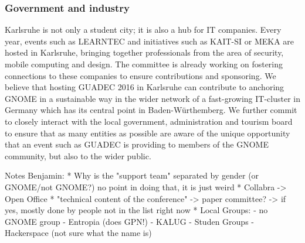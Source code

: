 \subsubsection{ Government and industry}

Karlsruhe is not only a student city; it is also a hub for IT companies. Every year, events such as LEARNTEC and initiatives such as KAIT-SI or MEKA are hosted in Karlsruhe, bringing together professionals from the area of security, mobile computing and design. The committee is already working on fostering connections to these companies to ensure contributions and sponsoring. We believe that hosting GUADEC 2016 in Karlsruhe can contribute to anchoring GNOME in a sustainable way in the wider network of a fast-growing IT-cluster in Germany which has its central point in Baden-Würthemberg. We further commit to closely interact with the local government, administration and tourism board to ensure that as many entities as possible are aware of the unique opportunity that an event such as GUADEC is providing to members of the GNOME community, but also to the wider public.  


Notes Benjamin:
 * Why is the "support team" separated by gender (or GNOME/not GNOME?) no point in doing that, it is just weird
 * Collabra -> Open Office
 * "technical content of the conference" -> paper committee? -> if yes, mostly done by people not in the list right now
 * Local Groups:
   - no GNOME group
   - Entropia (does GPN!)
   - KALUG
   - Studen Groups
   - Hackerspace (not sure what the name is)

